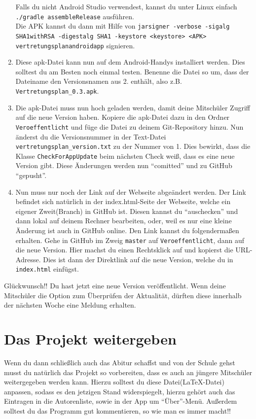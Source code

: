 \documentclass[12pt,headsepline]{scrartcl}
\begin{document}
\begin{enumerate}
Falls du nicht Android Studio verwendest, kannst du unter Linux einfach \texttt{./gradle assembleRelease} ausführen. \\
Die APK kannst du dann mit Hilfe von \texttt{jarsigner -verbose -sigalg SHA1withRSA -digestalg SHA1 -keystore <keystore> <APK> vertretungsplanandroidapp} signieren.
 \item Diese apk-Datei kann nun auf dem Android-Handys installiert werden. Dies solltest du am Besten noch einmal testen. Benenne die Datei so um, dass der Dateiname den Versionsnamen aus 2. enthält, also z.B. \texttt{Vertretungsplan\_0.3.apk}.
 \item Die apk-Datei muss nun hoch geladen werden, damit deine Mitschüler Zugriff auf die neue Version haben. Kopiere die apk-Datei dazu in den Ordner \texttt{Veroeffentlicht} und füge die Datei zu deinem Git-Repository hinzu. Nun änderst du die Versionsnummer in der Text-Datei \texttt{vertretungsplan\_version.txt} zu der Nummer von 1.  Dies bewirkt, dass die Klasse \texttt{CheckForAppUpdate} beim nächsten Check weiß, dass es eine neue Version gibt. Diese Änderungen werden nun ``comitted'' und zu GitHub ``gepusht''.
 \item Nun muss nur noch der Link auf der Webseite abgeändert werden. Der Link befindet sich natürlich in der index.html-Seite der Webseite, welche ein eigener Zweit(Branch) in GitHub ist. Diesen kannst du ``auschecken'' und dann lokal auf deinem Rechner bearbeiten, oder, weil es nur eine kleine Änderung ist auch in GitHub online. Den Link kannst du folgendermaßen erhalten. Gehe in GitHub im Zweig \texttt{master} auf \texttt{Veroeffentlicht}, dann auf die neue Version. Hier machst du einen Rechtsklick auf  und kopierst die URL-Adresse. Dies ist dann der Direktlink auf die neue Version, welche du in \texttt{index.html} einfügst.
 \end{enumerate}
 Glückwunsch!! Du hast jetzt eine neue Version veröffentlicht. Wenn deine Mitschüler die Option zum Überprüfen der Aktualität, dürften diese innerhalb der nächsten Woche eine Meldung erhalten.

\section{Das Projekt weitergeben}
Wenn du dann schließlich auch das Abitur schaffst und von der Schule gehst musst du natürlich das Projekt so vorbereiten, dass es auch an jüngere Mitschüler weitergegeben werden kann. Hierzu solltest du diese Datei(\LaTeX-Datei) anpassen, sodass es den jetzigen Stand widerspiegelt, hierzu gehört auch das Eintragen in die Autorenliste, sowie in der App um ``Über''-Menü. Außerdem solltest du das Programm gut kommentieren, so wie man es immer macht!!
\end{document}

